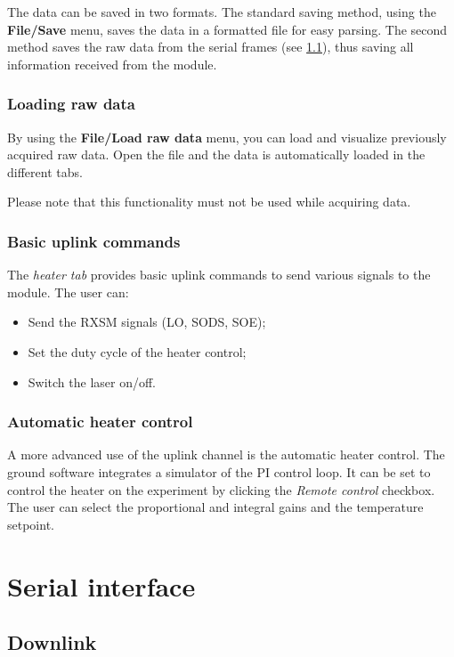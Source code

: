 \documentclass[11pt,a4paper,oneside]{report}
\begin{document}
The data can be saved in two formats. The standard saving method, using the \textbf{File/Save} menu, saves the data in a formatted file for easy parsing. The second method saves the raw data from the serial frames (see \ref{section:downlink}), thus saving all information received from the module.

\subsection{Loading raw data}

By using the \textbf{File/Load raw data} menu, you can load and visualize previously acquired raw data.
Open the file and the data is automatically loaded in the different tabs.

Please note that this functionality must not be used while acquiring data.

\subsection{Basic uplink commands}

The \emph{heater tab} provides basic uplink commands to send various signals to the module.
The user can:

\begin{itemize}
\item Send the RXSM signals (LO, SODS, SOE);
\item Set the duty cycle of the heater control;
\item Switch the laser on/off.
\end{itemize}

\subsection{Automatic heater control}
\label{subsection:automatic_heater_control}

A more advanced use of the uplink channel is the automatic heater control.
The ground software integrates a simulator of the PI control loop.
It can be set to control the heater on the experiment by clicking the \emph{Remote control} checkbox.
The user can select the proportional and integral gains and the temperature setpoint.

\chapter{Serial interface}

\section{Downlink}
\label{section:downlink}
\end{document}
